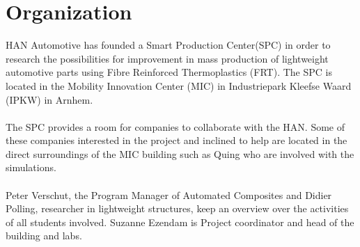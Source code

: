 
\chapter{Organization}

HAN Automotive has founded a Smart Production Center(SPC) in order to research the possibilities for improvement in mass production of lightweight automotive parts using Fibre Reinforced Thermoplastics (FRT). The SPC is located in the Mobility Innovation Center (MIC) in 
Industriepark Kleefse Waard (IPKW)
 in Arnhem. \\
 \\
 The SPC provides a room for companies to collaborate with the HAN.  Some of these companies interested in the project and inclined to help are located in the direct surroundings of the MIC building such as Quing who are involved with the simulations. \\
 \\
 Peter Verschut, the Program Manager of Automated Composites and Didier Polling, researcher in lightweight structures, keep an overview over the activities of all students involved. Suzanne Ezendam is Project coordinator and head of the building and labs.